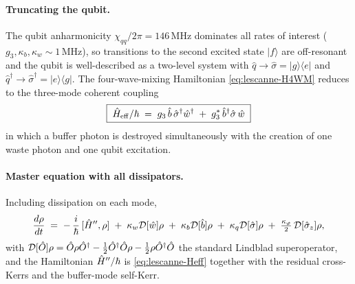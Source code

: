 \paragraph{Truncating the qubit.}
The qubit anharmonicity $\chi_{qq}/2\pi=146$\,MHz dominates all rates
of interest ($g_3,\kappa_b,\kappa_w\sim 1$\,MHz), so transitions to
the second excited state $|f\rangle$ are off-resonant and the qubit
is well-described as a two-level system with
$\hat q\to\hat\sigma=|g\rangle\langle e|$ and
$\hat q^\dagger\to\hat\sigma^\dagger=|e\rangle\langle g|$. The
four-wave-mixing Hamiltonian \cref{eq:lescanne-H4WM} reduces to
the three-mode coherent coupling
\begin{equation}
\label{eq:lescanne-Heff}
\boxed{\;\hat{H}_{\rm eff}/\hbar
\;=\; g_3\,\hat b\,\hat\sigma^\dagger\hat w^\dagger
\;+\; g_3^*\,\hat b^\dagger\hat\sigma\,\hat w\;}
\end{equation}
in which a buffer photon is destroyed simultaneously with the
creation of one waste photon and one qubit excitation.

\paragraph{Master equation with all dissipators.}
Including dissipation on each mode,
\begin{equation}
\label{eq:lescanne-master}
\frac{d\rho}{dt}
\;=\; -\,\frac{i}{\hbar}\,[\hat{H}'',\rho]
\;+\; \kappa_w\mathcal D[\hat w]\rho
\;+\; \kappa_b\mathcal D[\hat b]\rho
\;+\; \kappa_q\mathcal D[\hat\sigma]\rho
\;+\; \tfrac{\kappa_\varphi}{2}\,\mathcal D[\hat\sigma_z]\rho,
\end{equation}
with $\mathcal D[\hat{O}]\rho=\hat{O}\rho\hat{O}^\dagger
-\tfrac{1}{2}\hat{O}^\dagger\hat{O}\rho-\tfrac{1}{2}\rho\hat{O}^\dagger\hat{O}$
the standard Lindblad superoperator, and the Hamiltonian
$\hat{H}''/\hbar$ is \cref{eq:lescanne-Heff} together with the
residual cross-Kerrs and the buffer-mode self-Kerr.

